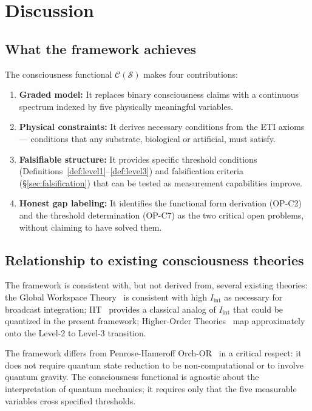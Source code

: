 \documentclass[12pt,letterpaper]{article}
\newcommand{\Cfunc}{\mathcal{C}}
\newcommand{\Iint}{I_{\mathrm{int}}}
\begin{document}
\section{Discussion}
\label{sec:discussion}

\subsection{What the framework achieves}

The consciousness functional $\Cfunc(\mathcal{S})$ makes four contributions:

\begin{enumerate}[label=(\roman*)]
  \item \textbf{Graded model:} It replaces binary consciousness claims with a
    continuous spectrum indexed by five physically meaningful variables.
  \item \textbf{Physical constraints:} It derives necessary conditions from
    the ETI axioms --- conditions that any substrate, biological or artificial,
    must satisfy.
  \item \textbf{Falsifiable structure:} It provides specific threshold
    conditions (Definitions~\ref{def:level1}--\ref{def:level3}) and
    falsification criteria (\S\ref{sec:falsification}) that can be tested
    as measurement capabilities improve.
  \item \textbf{Honest gap labeling:} It identifies the functional form
    derivation (OP-C2) and the threshold determination (OP-C7) as the
    two critical open problems, without claiming to have solved them.
\end{enumerate}

\subsection{Relationship to existing consciousness theories}

The framework is consistent with, but not derived from, several existing
theories: the Global Workspace Theory~\cite{Baars1997} is consistent with
high $\Iint$ as necessary for broadcast integration; IIT~\cite{Tononi2004}
provides a classical analog of $\Iint$ that could be quantized in the
present framework; Higher-Order Theories~\cite{Rosenthal2005} map
approximately onto the Level-2 to Level-3 transition.

The framework differs from Penrose-Hameroff Orch-OR~\cite{Penrose1994}
in a critical respect: it does not require quantum state reduction to be
non-computational or to involve quantum gravity. The consciousness functional
is agnostic about the interpretation of quantum mechanics; it requires
only that the five measurable variables cross specified thresholds.
\end{document}
